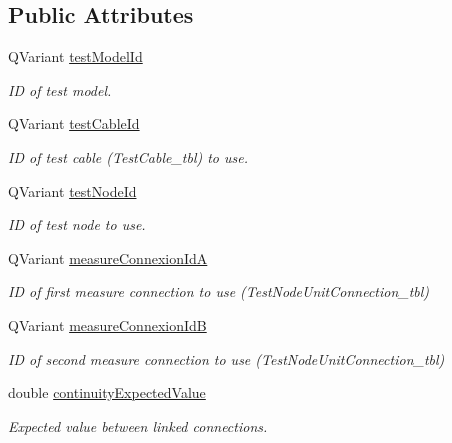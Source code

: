 \subsection*{Public Attributes}
\begin{DoxyCompactItemize}
\item 
Q\-Variant \hyperlink{structmdt_tt_test_model_generation_parameter_ab79f1c298f0178458237091396789f15}{test\-Model\-Id}
\begin{DoxyCompactList}\small\item\em I\-D of test model. \end{DoxyCompactList}\item 
Q\-Variant \hyperlink{structmdt_tt_test_model_generation_parameter_a8afb7c2e6d598b72c8af8e0dfc4a107a}{test\-Cable\-Id}
\begin{DoxyCompactList}\small\item\em I\-D of test cable (Test\-Cable\-\_\-tbl) to use. \end{DoxyCompactList}\item 
Q\-Variant \hyperlink{structmdt_tt_test_model_generation_parameter_a8423cfc73db0e57db394d7ce457c8c8d}{test\-Node\-Id}
\begin{DoxyCompactList}\small\item\em I\-D of test node to use. \end{DoxyCompactList}\item 
Q\-Variant \hyperlink{structmdt_tt_test_model_generation_parameter_a4b3fc18a0cb721b4cb7e945ce91469c7}{measure\-Connexion\-Id\-A}
\begin{DoxyCompactList}\small\item\em I\-D of first measure connection to use (Test\-Node\-Unit\-Connection\-\_\-tbl) \end{DoxyCompactList}\item 
Q\-Variant \hyperlink{structmdt_tt_test_model_generation_parameter_a0e4fba83adf5488dcc87d2ff1ee0edca}{measure\-Connexion\-Id\-B}
\begin{DoxyCompactList}\small\item\em I\-D of second measure connection to use (Test\-Node\-Unit\-Connection\-\_\-tbl) \end{DoxyCompactList}\item 
double \hyperlink{structmdt_tt_test_model_generation_parameter_a2ef746fefd93196b2b0adcbbcd57406c}{continuity\-Expected\-Value}
\begin{DoxyCompactList}\small\item\em Expected value between linked connections. \end{DoxyCompactList}\item 

\end{DoxyCompactItemize}
